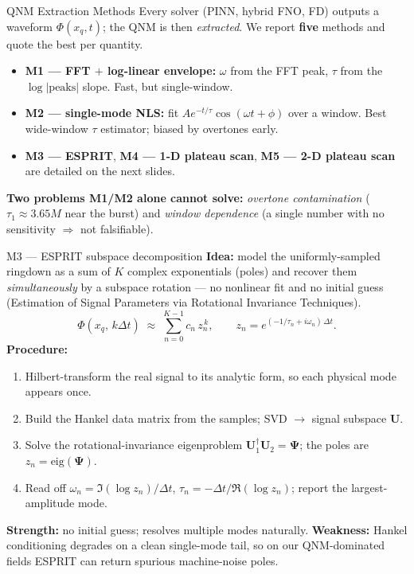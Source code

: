 \documentclass[aspectratio=169, 11pt]{beamer}
\newcommand{\qnm}{QNM}
\newcommand{\xq}{x_{q}}
\begin{document}
\begin{frame}{QNM Extraction Methods}
  Every solver (PINN, hybrid FNO, FD) outputs a waveform $\Phi(\xq,t)$; the \qnm{}
  is then \emph{extracted}. We report \textbf{five} methods and quote the best per quantity.
  \medskip
  \begin{itemize}\small
    \item \textbf{M1 --- FFT $+$ log-linear envelope:} $\omega$ from the FFT peak,
          $\tau$ from the $\log|\text{peaks}|$ slope. Fast, but single-window.
    \item \textbf{M2 --- single-mode NLS:} fit $A e^{-t/\tau}\cos(\omega t+\phi)$ over a
          window. Best wide-window $\tau$ estimator; biased by overtones early.
    \item \textbf{M3 --- ESPRIT}, \textbf{M4 --- 1-D plateau scan},
          \textbf{M5 --- 2-D plateau scan} are detailed on the next slides.
  \end{itemize}
  \medskip
  \textbf{Two problems M1/M2 alone cannot solve:}
  \emph{overtone contamination} ($\tau_{1}\!\approx\!3.65M$ near the burst) and
  \emph{window dependence} (a single number with no sensitivity $\Rightarrow$ not falsifiable).
\end{frame}

\begin{frame}{M3 --- ESPRIT subspace decomposition}
  \textbf{Idea:} model the uniformly-sampled ringdown as a sum of $K$ complex
  exponentials (poles) and recover them \emph{simultaneously} by a subspace
  rotation --- no nonlinear fit and no initial guess (Estimation of Signal
  Parameters via Rotational Invariance Techniques).
  \[
    \Phi(\xq,\,k\Delta t)\;\approx\;\sum_{n=0}^{K-1} c_{n}\,z_{n}^{\,k},
    \qquad
    z_{n}=e^{(-1/\tau_{n}+i\omega_{n})\,\Delta t}.
  \]
  \textbf{Procedure:}
  \begin{enumerate}\small
    \item Hilbert-transform the real signal to its analytic form, so each
          physical mode appears once.
    \item Build the Hankel data matrix from the samples; SVD $\to$ signal
          subspace $\mathbf{U}$.
    \item Solve the rotational-invariance eigenproblem
          $\mathbf{U}_{1}^{\dagger}\mathbf{U}_{2}=\boldsymbol{\Psi}$; the poles are
          $z_{n}=\mathrm{eig}(\boldsymbol{\Psi})$.
    \item Read off $\omega_{n}=\Im(\log z_{n})/\Delta t$,\;
          $\tau_{n}=-\Delta t/\Re(\log z_{n})$; report the largest-amplitude mode.
  \end{enumerate}
  \medskip
  \textbf{Strength:} no initial guess; resolves multiple modes naturally.\quad
  \textbf{Weakness:} Hankel conditioning degrades on a clean single-mode tail, so
  on our QNM-dominated fields ESPRIT can return spurious machine-noise poles.
\end{frame}
\end{document}
